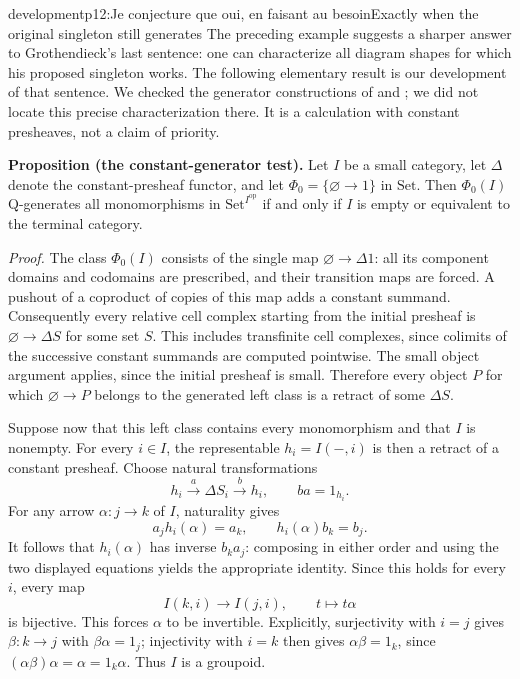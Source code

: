\begin{dcomment}{development}{p12:Je conjecture que oui, en faisant au besoin}{Exactly when the original singleton still generates}
The preceding example suggests a sharper answer to Grothendieck's last sentence: one can characterize all diagram shapes for which his proposed singleton works. The following elementary result is our development of that sentence. We checked the generator constructions of \citet[Lemma~A.2.8.3]{Lurie2009HTT} and \citet[Corollary~3.4]{MakkaiRosicky2014}; we did not locate this precise characterization there. It is a calculation with constant presheaves, not a claim of priority.

\textbf{Proposition (the constant-generator test).}\ours
Let $I$ be a small category, let $\Delta$ denote the constant-presheaf functor, and let $\Phi_0=\{\varnothing\to1\}$ in $\mathrm{Set}$. Then $\Phi_0(I)$ Q-generates all monomorphisms in $\mathrm{Set}^{I^{\mathrm{op}}}$ if and only if $I$ is empty or equivalent to the terminal category.

\textit{Proof.} The class $\Phi_0(I)$ consists of the single map $\varnothing\to\Delta1$: all its component domains and codomains are prescribed, and their transition maps are forced. A pushout of a coproduct of copies of this map adds a constant summand. Consequently every relative cell complex starting from the initial presheaf is $\varnothing\to\Delta S$ for some set $S$. This includes transfinite cell complexes, since colimits of the successive constant summands are computed pointwise. The small object argument applies, since the initial presheaf is small. Therefore every object $P$ for which $\varnothing\to P$ belongs to the generated left class is a retract of some $\Delta S$.

Suppose now that this left class contains every monomorphism and that $I$ is nonempty. For every $i\in I$, the representable $h_i=I(-,i)$ is then a retract of a constant presheaf. Choose natural transformations
\[
 h_i\xrightarrow{a}\Delta S_i\xrightarrow{b}h_i,
 \qquad ba=1_{h_i}.
\]
For any arrow $\alpha:j\to k$ of $I$, naturality gives
\[
 a_jh_i(\alpha)=a_k,\qquad
 h_i(\alpha)b_k=b_j.
\]
It follows that $h_i(\alpha)$ has inverse $b_ka_j$: composing in either order and using the two displayed equations yields the appropriate identity. Since this holds for every $i$, every map
\[
 I(k,i)\longrightarrow I(j,i),\qquad t\longmapsto t\alpha
\]
is bijective. This forces $\alpha$ to be invertible. Explicitly, surjectivity with $i=j$ gives $\beta:k\to j$ with $\beta\alpha=1_j$; injectivity with $i=k$ then gives $\alpha\beta=1_k$, since $(\alpha\beta)\alpha=\alpha=1_k\alpha$. Thus $I$ is a groupoid.


\end{dcomment}

